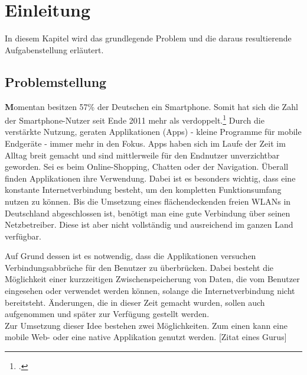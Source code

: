 \chapter{Einleitung}
\label{cha:einleitung}
In diesem Kapitel wird das grundlegende Problem und die daraus resultierende Aufgabenstellung erläutert.

\section{Problemstellung}
\label{sec:problemstellung}

\textbf
Momentan besitzen 57\% der Deutschen ein Smartphone. Somit hat sich die Zahl der Smartphone-Nutzer seit Ende 2011 mehr als verdoppelt.\footcite{Statista}
Durch die verstärkte Nutzung, geraten Applikationen (Apps) - kleine Programme für mobile Endgeräte - immer mehr in den Fokus.
Apps haben sich im Laufe der Zeit im Alltag breit gemacht und sind mittlerweile für den Endnutzer unverzichtbar geworden. Sei es beim Online-Shopping, Chatten oder der Navigation. Überall finden Applikationen ihre Verwendung.
Dabei ist es besonders wichtig, dass eine konstante Internetverbindung besteht, um den kompletten Funktionsumfang nutzen zu können.
Bis die Umsetzung eines flächendeckenden freien WLANs in Deutschland abgeschlossen ist, benötigt man eine gute Verbindung über seinen Netzbetreiber. Diese ist aber nicht vollständig und ausreichend im ganzen Land verfügbar.

Auf Grund dessen ist es notwendig, dass die Applikationen versuchen Verbindungsabbrüche für den Benutzer zu überbrücken. Dabei besteht die Möglichkeit einer kurzzeitigen Zwischenspeicherung von Daten, die vom Benutzer eingesehen oder verwendet werden können, solange die Internetverbindung nicht bereitsteht. Änderungen, die in dieser Zeit gemacht wurden, sollen auch aufgenommen und später zur Verfügung gestellt werden.\\
Zur Umsetzung dieser Idee bestehen zwei Möglichkeiten. Zum einen kann eine mobile Web- oder eine native Applikation genutzt werden. [Zitat eines Gurus]




